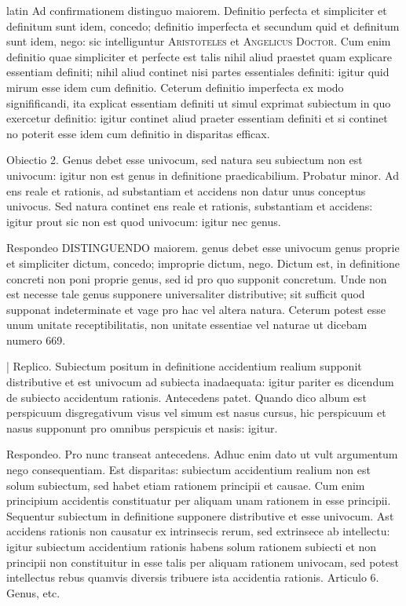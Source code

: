 \begin{otherlanguage*}{latin}
\pstart
Ad confirmationem distinguo maiorem. Definitio perfecta et simpliciter et definitum sunt idem, concedo; definitio imperfecta et secundum quid et definitum sunt idem, nego:
sic intelliguntur \textsc{Aristoteles} et \textsc{Angelicus Doctor}. Cum enim definitio quae simpliciter et perfecte est talis nihil aliud praestet quam explicare essentiam definiti; nihil aliud continet nisi partes essentiales definiti:
igitur quid mirum esse idem cum definitio. Ceterum definitio imperfecta ex modo signifificandi, ita explicat essentiam definiti ut simul exprimat subiectum in quo exercetur definitio:
igitur continet aliud praeter essentiam definiti et si continet no poterit esse idem cum definitio in disparitas efficax. 
\pend

\pstart
Obiectio 2. Genus debet esse univocum, sed natura seu subiectum non est  univocum:
igitur non est genus in definitione praedicabilium. Probatur minor. Ad ens reale et rationis, ad substantiam et accidens non datur unus conceptus univocus. Sed natura continet ens reale et rationis, substantiam et accidens:
igitur prout sic non est quod univocum:
igitur nec genus. 
\pend

\pstart
Respondeo DISTINGUENDO maiorem. genus debet esse univocum genus proprie et simpliciter dictum, concedo; improprie dictum, nego. Dictum est, in definitione concreti non poni proprie genus, sed id pro quo supponit concretum. Unde non est necesse tale genus supponere universaliter distributive; sit sufficit quod supponat indeterminate et vage pro hac vel altera natura. Ceterum potest esse unum unitate receptibilitatis, non unitate essentiae vel naturae ut dicebam numero 669. 
\pend

\pstart
\textnormal{|} Replico. Subiectum positum in definitione accidentium realium supponit distributive et est univocum ad subiecta inadaequata:
igitur pariter es dicendum de subiecto accidentum rationis. Antecedens patet. Quando dico album est perspicuum disgregativum visus vel simum est nasus cursus, hic perspicuum et nasus supponunt pro omnibus perspicuis et nasis:
igitur. 
\pend

\pstart
Respondeo. Pro nunc transeat antecedens. Adhuc enim dato ut vult argumentum nego consequentiam. Est disparitas:
subiectum accidentium realium non est solum subiectum, sed habet etiam rationem principii et causae. Cum enim principium accidentis constituatur per aliquam unam rationem in esse principii. Sequentur subiectum in definitione supponere distributive et esse univocum. Ast accidens rationis non causatur ex intrinsecis rerum, sed extrinsece ab intellectu:
igitur subiectum accidentium rationis habens solum rationem subiecti et non principii non constituitur in esse talis per aliquam rationem univocam, sed potest intellectus rebus quamvis diversis tribuere ista accidentia rationis. Articulo 6. Genus, etc. 
\pend


\end{otherlanguage*}
